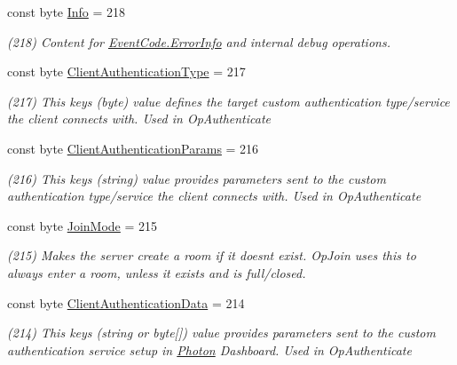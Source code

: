 \begin{DoxyCompactItemize}
const byte \hyperlink{class_exit_games_1_1_client_1_1_photon_1_1_parameter_code_ad7faa8ed1297c1ca6954f85cff1e7da2}{Info} = 218
\begin{DoxyCompactList}\small\item\em (218) Content for \hyperlink{class_exit_games_1_1_client_1_1_photon_1_1_event_code_a5515318245655c141be84934f461053c}{Event\+Code.\+Error\+Info} and internal debug operations.\end{DoxyCompactList}\item 
const byte \hyperlink{class_exit_games_1_1_client_1_1_photon_1_1_parameter_code_aced7dd5821acb92b52696d064e19714b}{Client\+Authentication\+Type} = 217
\begin{DoxyCompactList}\small\item\em (217) This key\textquotesingle{}s (byte) value defines the target custom authentication type/service the client connects with. Used in Op\+Authenticate\end{DoxyCompactList}\item 
const byte \hyperlink{class_exit_games_1_1_client_1_1_photon_1_1_parameter_code_aa038563acd329dd1ec796bc3dbda94ed}{Client\+Authentication\+Params} = 216
\begin{DoxyCompactList}\small\item\em (216) This key\textquotesingle{}s (string) value provides parameters sent to the custom authentication type/service the client connects with. Used in Op\+Authenticate\end{DoxyCompactList}\item 
const byte \hyperlink{class_exit_games_1_1_client_1_1_photon_1_1_parameter_code_ac9b4c279b2c2447d2b6a92d048279534}{Join\+Mode} = 215
\begin{DoxyCompactList}\small\item\em (215) Makes the server create a room if it doesn\textquotesingle{}t exist. Op\+Join uses this to always enter a room, unless it exists and is full/closed.\end{DoxyCompactList}\item 
const byte \hyperlink{class_exit_games_1_1_client_1_1_photon_1_1_parameter_code_a02245ae597165f8efbdc27cdc2465521}{Client\+Authentication\+Data} = 214
\begin{DoxyCompactList}\small\item\em (214) This key\textquotesingle{}s (string or byte\mbox{[}\mbox{]}) value provides parameters sent to the custom authentication service setup in \hyperlink{namespace_exit_games_1_1_client_1_1_photon}{Photon} Dashboard. Used in Op\+Authenticate\end{DoxyCompactList}\item 

\end{DoxyCompactItemize}
